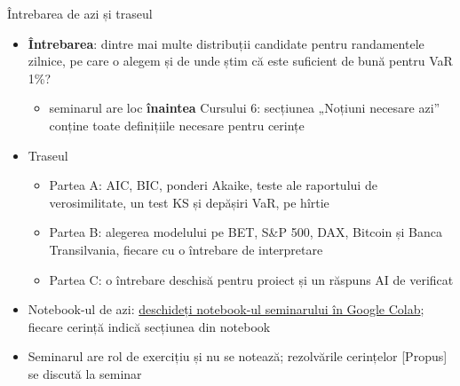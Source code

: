 \begin{frame}{Întrebarea de azi și traseul}
\itemsize{\small}
\begin{itemize}
    \item \textbf{Întrebarea}: dintre mai multe distribuții candidate pentru randamentele zilnice, pe care o alegem și de unde știm că este suficient de bună pentru VaR 1\%?
    \begin{itemize}
        \item seminarul are loc \textbf{înaintea} Cursului 6: secțiunea „Noțiuni necesare azi” conține toate definițiile necesare pentru cerințe
    \end{itemize}
    \item Traseul
    \begin{itemize}
        \item Partea A: AIC, BIC, ponderi Akaike, teste ale raportului de verosimilitate, un test KS și depășiri VaR, pe hîrtie
        \item Partea B: alegerea modelului pe BET, S\&P 500, DAX, Bitcoin și Banca Transilvania, fiecare cu o întrebare de interpretare
        \item Partea C: o întrebare deschisă pentru proiect și un răspuns AI de verificat
    \end{itemize}
    \item Notebook-ul de azi: \href{\nb}{deschideți notebook-ul seminarului în Google Colab}; fiecare cerință indică secțiunea din notebook
    \item Seminarul are rol de exercițiu și nu se notează; rezolvările cerințelor [Propus] se discută la seminar
\end{itemize}
\end{frame}

